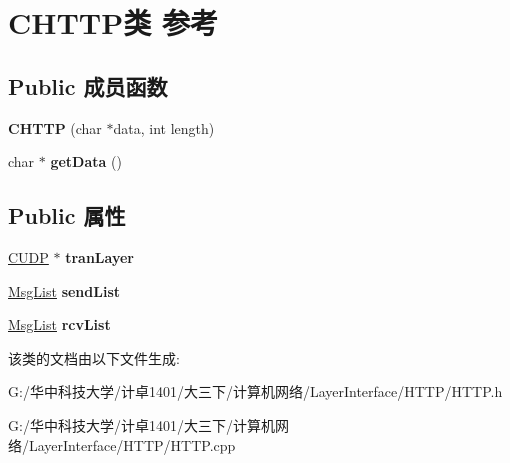 \hypertarget{class_c_h_t_t_p}{}\section{C\+H\+T\+T\+P类 参考}
\label{class_c_h_t_t_p}
\subsection*{Public 成员函数}
\begin{DoxyCompactItemize}
\item 
\mbox{\label{class_c_h_t_t_p_a6c17fb2fe68967e23bd39012b1f70c68}} 
{\bfseries C\+H\+T\+TP} (char $\ast$data, int length)
\item 
\mbox{\label{class_c_h_t_t_p_a4866e1561e808229ff6244e866356741}} 
char $\ast$ {\bfseries get\+Data} ()
\end{DoxyCompactItemize}
\subsection*{Public 属性}
\begin{DoxyCompactItemize}
\item 
\mbox{\label{class_c_h_t_t_p_a0732dddaf54fa24a1554e566fcfa4eef}} 
\hyperlink{class_c_u_d_p}{C\+U\+DP} $\ast$ {\bfseries tran\+Layer}
\item 
\mbox{\label{class_c_h_t_t_p_a8cf28a01350c98fe3e4cbf4920da25c5}} 
\hyperlink{class_msg_list}{Msg\+List} {\bfseries send\+List}
\item 
\mbox{\label{class_c_h_t_t_p_a86395cb3e64e45d31fda86b8e2ebf9dc}} 
\hyperlink{class_msg_list}{Msg\+List} {\bfseries rcv\+List}
\end{DoxyCompactItemize}


该类的文档由以下文件生成\+:\begin{DoxyCompactItemize}
\item 
G\+:/华中科技大学/计卓1401/大三下/计算机网络/\+Layer\+Interface/\+H\+T\+T\+P/H\+T\+T\+P.\+h\item 
G\+:/华中科技大学/计卓1401/大三下/计算机网络/\+Layer\+Interface/\+H\+T\+T\+P/H\+T\+T\+P.\+cpp\end{DoxyCompactItemize}
